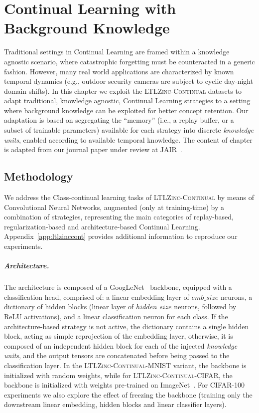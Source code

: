 \chapter{Continual Learning with Background Knowledge}
\label{chap:zincontinual}

Traditional settings in Continual Learning are framed within a knowledge agnostic scenario, where catastrophic forgetting must be counteracted in a generic fashion. However, many real world applications are characterized by known temporal dynamics (e.g., outdoor security cameras are subject to cyclic day-night domain shifts). In this chapter we exploit the \textsc{LTLZinc-Continual} datasets to adapt traditional, knowledge agnostic, Continual Learning strategies to a setting where background knowledge can be exploited for better concept retention. Our adaptation is based on segregating the ``memory'' (i.e., a replay buffer, or a subset of trainable parameters) available for each strategy into discrete \textit{knowledge units}, enabled according to available temporal knowledge.
%
The content of chapter is adapted from our journal paper under review at JAIR~\cite{lorello2025ltlzinc}.

\section{Methodology}
We address the Class-continual learning tasks of \textsc{LTLZinc-Continual} by means of Convolutional Neural Networks, augmented (only at training-time) by a combination of strategies, representing the main categories of replay-based, regularization-based and architecture-based Continual Learning. Appendix~\ref{app:ltlzinccont} provides additional information to reproduce our experiments.
%
\paragraph{Architecture.} The architecture is composed of a GoogLeNet~\cite{szegedy2015going} backbone, equipped with a classification head, comprised of: a linear embedding layer of $emb\_size$ neurons, a dictionary of hidden blocks (linear layer of $hidden\_size$ neurons, followed by ReLU activations), and a linear classification neuron for each class.
If the architecture-based strategy is not active, the dictionary contains a single hidden block, acting as simple reprojection of the embedding layer, otherwise, it is composed of an independent hidden block for each of the injected \textit{knowledge units}, and the output tensors are concatenated before being passed to the classification layer.
In the \textsc{LTLZinc-Continual-MNIST} variant, the backbone is initialized with random weights, while for \textsc{LTLZinc-Continual-CIFAR}, the backbone is initialized with weights pre-trained on ImageNet~\cite{russakovsky2015imagenet}. For \textsc{CIFAR-100} experiments we also explore the effect of freezing the backbone (training only the downstream linear embedding, hidden blocks and linear classifier layers).

